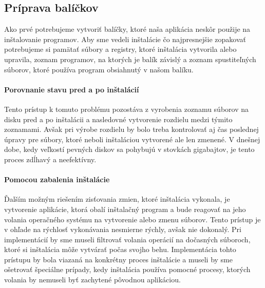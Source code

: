 \subsection{Príprava balíčkov}
Ako prvé potrebujeme vytvoriť balíčky, ktoré naša aplikácia neskôr použije na inštalovanie programov. Aby sme vedeli inštalácie čo najpresnejšie zopakovať potrebujeme si pamätať súbory a registry, ktoré inštalácia vytvorila alebo upravila, zoznam programov, na ktorých je balík závislý a zoznam spustiteľných súborov, ktoré používa program obsiahnutý v našom balíku.

\paragraph{Porovnanie stavu pred a po inštalácií}
Tento prístup k tomuto problému pozostáva z vyrobenia zoznamu súborov na disku pred a po inštalácii a nasledovné vytvorenie rozdielu medzi týmito zoznamami. Avšak pri výrobe rozdielu by bolo treba kontrolovať aj čas poslednej úpravy pre súbory, ktoré neboli inštaláciou vytvorené ale len zmenené. V dnešnej dobe, kedy veľkostí pevných diskov sa pohybujú v stovkách gigabajtov, je tento proces zdĺhavý a neefektívny. 
\paragraph{Pomocou zabalenia inštalácie}
Ďalším možným riešením zisťovania zmien, ktoré inštalácia vykonala, je vytvorenie aplikácie, ktorá obalí inštalačný program a bude reagovať na jeho volania operačného systému na vytvorenie alebo zmenu súborov. Tento prístup je v ohľade na rýchlosť vykonávania nesmierne rýchly, avšak nie dokonalý. Pri implementácií by sme museli filtrovať volania operácií na dočasných súboroch, ktoré si inštalácia môže vytvárať počas svojho behu. Implementácia tohto prístupu by bola viazaná na konkrétny proces inštalácie a museli by sme ošetrovať špeciálne prípady, kedy inštalácia používa pomocné procesy, ktorých volania by nemuseli byť zachytené pôvodnou aplikáciou. 
